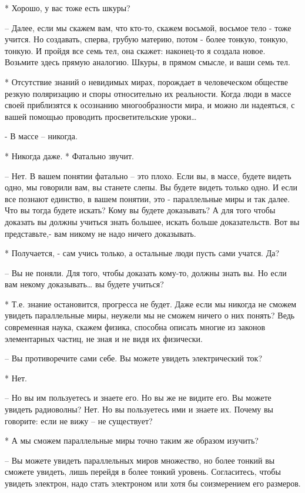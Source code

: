  * Хорошо, у вас тоже есть шкуры?

 – Далее, если мы скажем вам, что кто-то, скажем восьмой, восьмое тело - тоже учится. Но создавать, сперва, грубую материю, потом - более тонкую, тонкую, тонкую. И пройдя все семь тел, она скажет: наконец-то я создала новое. Возьмите здесь прямую аналогию. Шкуры, в прямом смысле, и ваши семь тел.

 * Отсутствие знаний о невидимых мирах, порождает в человеческом обществе резкую поляризацию и споры относительно их реальности. Когда люди в массе своей приблизятся к осознанию многообразности мира, и можно ли надеяться, с вашей помощью проводить просветительские уроки…

 - В массе – никогда.

 * Никогда даже.
 * Фатально звучит.

 – Нет. В вашем понятии фатально – это плохо. Если вы, в массе, будете видеть одно, мы говорили вам, вы станете слепы. Вы будете видеть только одно. И если все познают единство, в вашем понятии, это - параллельные миры и так далее. Что вы тогда будете искать? Кому вы будете доказывать? А для того чтобы доказать вы должны учиться знать большее, искать больше доказательств. Вот вы представьте,- вам никому не надо ничего доказывать.

 * Получается, - сам учись только, а остальные люди пусть сами учатся. Да?

 – Вы не поняли. Для того, чтобы доказать кому-то, должны знать вы. Но если вам некому доказывать… вы будете учиться?

 * Т.е. знание остановится, прогресса не будет. Даже если мы никогда не сможем увидеть параллельные миры, неужели мы не сможем ничего о них понять? Ведь современная наука, скажем физика, способна описать многие из законов элементарных частиц, не зная и не видя их физически.

 – Вы противоречите сами себе. Вы можете увидеть электрический ток?

 * Нет.

 – Но вы им пользуетесь и знаете его. Но вы же не видите его. Вы можете увидеть радиоволны? Нет. Но вы пользуетесь ими и знаете их. Почему вы говорите: если не вижу – не существует?

 * А мы сможем параллельные миры точно таким же образом изучить?

 – Вы можете увидеть параллельных миров множество, но более тонкий вы сможете увидеть, лишь перейдя в более тонкий уровень. Согласитесь, чтобы увидеть электрон, надо стать электроном или хотя бы соизмерением его размеров.

